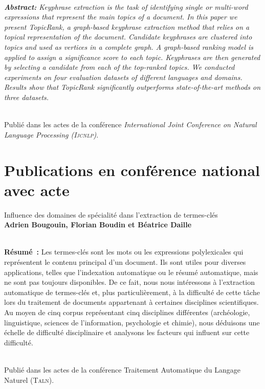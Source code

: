   ~\\\textit{
    \textbf{Abstract:}
    Keyphrase extraction is the task of identifying single or multi-word
    expressions that represent the main topics of a document. In this paper we
    present TopicRank, a graph-based keyphrase extraction method that relies on
    a topical representation of the document. Candidate keyphrases are clustered
    into topics and used as vertices in a complete graph. A graph-based ranking
    model is applied to assign a significance score to each topic. Keyphrases
    are then generated by selecting a candidate from each of the top-ranked
    topics. We conducted experiments on four evaluation datasets of different
    languages and domains. Results show that TopicRank significantly outperforms
    state-of-the-art methods on three datasets.
  }

  ~\\Publié dans les actes de la conférence \textit{International Joint
  Conference on Natural Language Processing (\textsc{Ijcnlp})}.

  \section*{Publications en conférence national avec acte}

  Influence des domaines de spécialité dans l'extraction de
  termes-clés\\\textbf{Adrien Bougouin, Florian Boudin et Béatrice
  Daille}\\\cite{bougouin2014difficulty}

  ~\\\textbf{Résumé~:}
  Les termes-clés sont les mots ou les expressions polylexicales qui
  représentent le contenu principal d'un document. Ils sont utiles pour
  diverses applications, telles que l'indexation automatique ou le résumé
  automatique, mais ne sont pas toujours disponibles. De ce fait, nous nous
  intéressons à l'extraction automatique de termes-clés et, plus
  particulièrement, à la difficulté de cette tâche lors du traitement de
  documents appartenant à certaines disciplines scientifiques. Au moyen de
  cinq corpus représentant cinq disciplines différentes (archéologie,
  linguistique, sciences de l'information, psychologie et chimie), nous
  déduisons une échelle de difficulté disciplinaire et analysons les facteurs
  qui influent sur cette difficulté.

  ~\\Publié dans les actes de la conférence Traitement Automatique du Langage
  Naturel (\textsc{Taln}).

